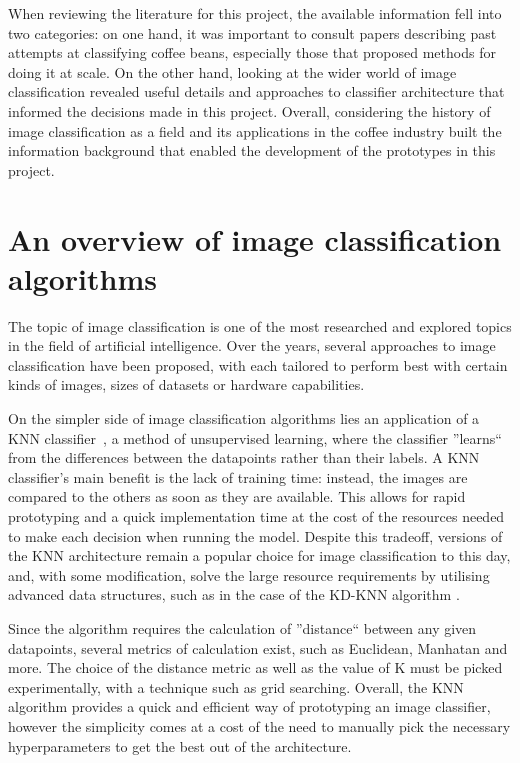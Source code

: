 When reviewing the literature for this project, the available information fell into
two categories: on one hand, it was important to consult papers describing past attempts
at classifying coffee beans, especially those that proposed methods for doing it
at scale. On the other hand, looking at the wider world of image classification
revealed useful details and approaches to classifier architecture that informed
the decisions made in this project. Overall, considering the history of image
classification as a field and its applications in the coffee industry built the
information background that enabled the development of the prototypes in this
project.

\section{An overview of image classification algorithms}
\label{sec:lit-review-general} The topic of image classification is one of the
most researched and explored topics in the field of artificial intelligence. Over
the years, several approaches to image classification have been proposed, with each
tailored to perform best with certain kinds of images, sizes of datasets or
hardware capabilities.

On the simpler side of image classification algorithms lies an application of a
KNN classifier~\cite{knnOverview}, a method of unsupervised learning, where the
classifier ''learns`` from the differences between the datapoints rather than
their labels. A KNN classifier's main benefit is the lack of training time:
instead, the images are compared to the others as soon as they are available.
This allows for rapid prototyping and a quick implementation time at the cost of
the resources needed to make each decision when running the model. Despite this tradeoff,
versions of the KNN architecture remain a popular choice for image
classification to this day, and, with some modification, solve the large resource
requirements by utilising advanced data structures, such as in the case of the
KD-KNN algorithm \cite{kdtreeKNN}.

Since the algorithm requires the calculation of ''distance`` between any given
datapoints, several metrics of calculation exist, such as Euclidean, Manhatan and
more. The choice of the distance metric as well as the value of K must be picked
experimentally, with a technique such as grid searching. Overall, the KNN algorithm
provides a quick and efficient way of prototyping an image classifier, however
the simplicity comes at a cost of the need to manually pick the necessary
hyperparameters to get the best out of the architecture.

